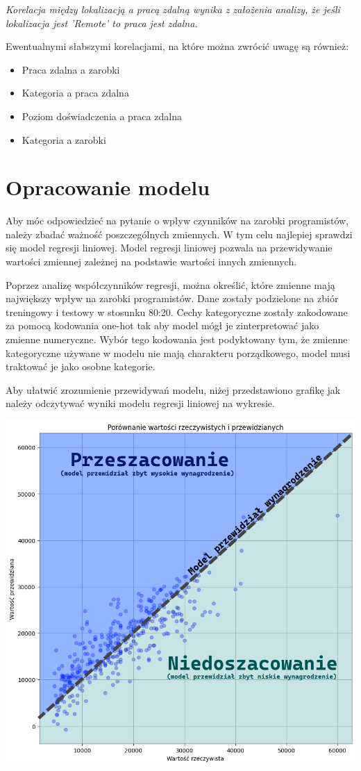 \documentclass{article}
\begin{document}
\textit{Korelacja między lokalizacją a pracą zdalną wynika z założenia analizy, że jeśli lokalizacja jest 'Remote' to praca jest zdalna.}
\medskip

Ewentualnymi słabszymi korelacjami, na które można zwrócić uwagę są również:
\begin{itemize}
    \item Praca zdalna a zarobki
    \item Kategoria a praca zdalna
    \item Poziom doświadczenia a praca zdalna
    \item Kategoria a zarobki
\end{itemize}

\section{Opracowanie modelu}

Aby móc odpowiedzieć na pytanie o wpływ czynników na zarobki programistów, należy zbadać ważność poszczególnych zmiennych.
W tym celu najlepiej sprawdzi się model regresji liniowej.
Model regresji liniowej pozwala na przewidywanie wartości zmiennej zależnej na podstawie wartości innych zmiennych.

Poprzez analizę współczynników regresji, można określić, które zmienne mają największy wpływ na zarobki programistów.
Dane zostały podzielone na zbiór treningowy i testowy w stosunku 80:20.
Cechy kategoryczne zostały zakodowane za pomocą kodowania one-hot tak aby model mógł je zinterpretować jako zmienne numeryczne.
Wybór tego kodowania jest podyktowany tym, że zmienne kategoryczne używane w modelu nie mają charakteru porządkowego, model musi
traktować je jako osobne kategorie.

Aby ułatwić zrozumienie przewidywań modelu, niżej przedstawiono grafikę jak należy odczytywać wyniki modelu regresji liniowej na wykresie.

\begin{center}
    \includegraphics[scale=0.4]{img/czytanie_wykres.png}
\end{center}
\end{document}
